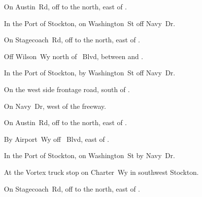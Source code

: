 
\begin{LocationList}

On Austin~Rd, off  to the north, east of .

In the Port of Stockton, on Washington~St off Navy~Dr.

On Stagecoach~Rd, off  to the north, east of .

Off Wilson~Wy north of \MLKing~Blvd, between   and  .

In the Port of Stockton, by Washington~St off Navy~Dr.

On the west side  frontage road, south of .

On Navy~Dr, west of the freeway.

On Austin~Rd, off  to the north, east of .

\Location{\RecruitmentAgency \Recruitment}
By Airport~Wy off \MLKing~Blvd, east of  .

In the Port of Stockton, on Washington~St by Navy~Dr.

At the Vortex truck stop on  Charter~Wy in southwest Stockton.

On Stagecoach~Rd, off  to the north, east of .

\end{LocationList}
